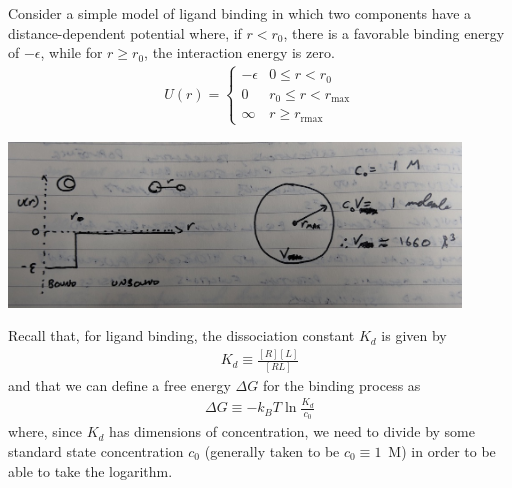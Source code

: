 \documentclass[english,course]{lecture}
\begin{document}
Consider a simple model of ligand binding in which two components have a distance-dependent potential where, if $r < r_0$, there is a favorable binding energy of $-\epsilon$, while for $r \ge r_0$, the interaction energy is zero.
\begin{eqnarray}
U(r) = \begin{cases}
-\epsilon & 0 \le r < r_0 \\
0 & r_0 \le r < r_\mathrm{max} \\
\infty & r \ge r_\mathrm{rmax}
\end{cases}
\end{eqnarray}

\begin{centering}
\includegraphics[width=0.9\textwidth]{figures/simple-ligand-binding.jpg}

\end{centering}

Recall that, for ligand binding, the dissociation constant $K_d$ is given by
\begin{eqnarray}
K_d \equiv \frac{[R][L]}{[RL]}
\end{eqnarray}
and that we can define a free energy $\Delta G$ for the binding process as
\begin{eqnarray}
\Delta G \equiv - k_B T \ln \frac{K_d}{c_0}
\end{eqnarray}
where, since $K_d$ has dimensions of concentration, we need to divide by some standard state concentration $c_0$ (generally taken to be $c_0 \equiv 1$~M) in order to be able to take the logarithm.
\end{document}

